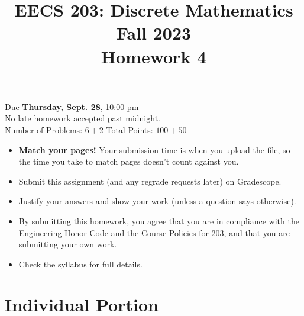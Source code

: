 \documentclass[12pt]{exam}
\begin{document}
\title{EECS 203: Discrete Mathematics\\
Fall 2023\\
Homework 4}
\date{}
\author{}
\maketitle
\vspace{-50pt}
\begin{center}
\huge Due \textbf{Thursday, Sept. 28}, 10:00 pm\\
\Large No late homework accepted past midnight.\\
\vspace{10pt}
\large Number of Problems: $6+2$
\hspace{3cm}
Total Points: $100+50$
\end{center}
\vspace{25pt}
\begin{itemize}
\item \textbf{Match your pages!} Your submission time is when you upload the
file, so the time you take to match pages doesn't count against you.
\item Submit this assignment (and any regrade requests later) on Gradescope.
\item Justify your answers and show your work (unless a question says
otherwise).
\item By submitting this homework, you agree that you are in compliance with
the Engineering Honor Code and the Course Policies for 203, and that you are
submitting your own work.
\item Check the syllabus for full details.
\end{itemize}
\newpage
\section*{Individual Portion}
\end{document}
